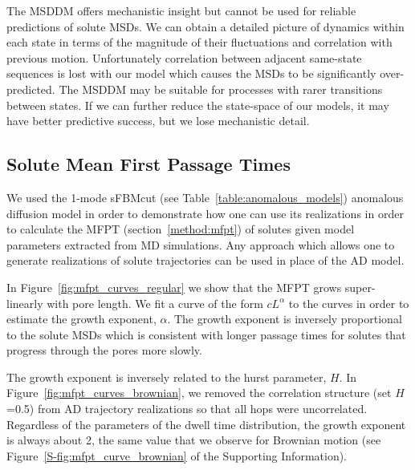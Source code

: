 \documentclass{article}
\begin{document}
  The MSDDM offers mechanistic insight but cannot be used for reliable predictions
  of solute MSDs. We can obtain a detailed picture of dynamics within each state in
  terms of the magnitude of their fluctuations and correlation with previous 
  motion. Unfortunately correlation between adjacent same-state sequences is lost
  with our model which causes the MSDs to be significantly over-predicted. The MSDDM
  may be suitable for processes with rarer transitions between states. If we can 
  further reduce the state-space of our models, it may have better predictive success,
  but we lose mechanistic detail.
  
  \subsection{Solute Mean First Passage Times}\label{section:mfpt}
  
  We used the 1-mode sFBMcut (see Table~\ref{table:anomalous_models}) anomalous 
  diffusion model in order to demonstrate how one can use its realizations in
  order to calculate the MFPT (section~\ref{method:mfpt}) of solutes given model 
  parameters extracted from MD simulations. Any approach which allows one to 
  generate realizations of solute trajectories can be used in place of the AD model. 
  
  In Figure~\ref{fig:mfpt_curves_regular} we show that the MFPT grows super-linearly
  with pore length. We fit a curve of the form $cL^{\alpha}$ to the curves in order
  to estimate the growth exponent, $\alpha$. The growth exponent is inversely proportional
  to the solute MSDs which is consistent with longer passage times for solutes that
  progress through the pores more slowly. 
  
  The growth exponent is inversely related to the hurst parameter, $H$. In 
  Figure~\ref{fig:mfpt_curves_brownian}, we removed the correlation structure (set
  $H$=0.5) from AD trajectory realizations so that all hops were uncorrelated.
  Regardless of the parameters of the dwell time distribution, the growth 
  exponent is always about 2, the same value that we observe for Brownian 
  motion (see Figure~\ref{S-fig:mfpt_curve_brownian} of the Supporting 
  Information).
  
\end{document}
